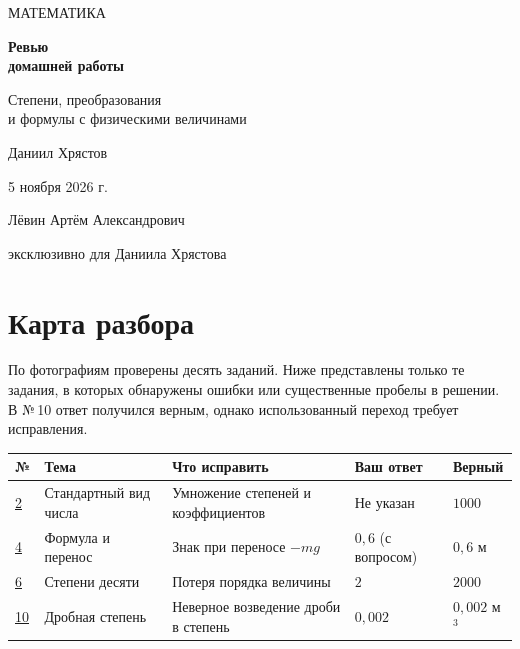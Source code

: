 \documentclass[a4paper,11pt]{article}
\begin{document}
\thispagestyle{empty}
\vspace*{37mm}
{\Large\textcolor{accent}{МАТЕМАТИКА}}\par
\vspace{13mm}
{\fontsize{30}{36}\selectfont\bfseries Ревью\\ домашней работы}\par
\vspace{7mm}
{\Large Степени, преобразования\\ и формулы с физическими величинами}\par
\vspace{24mm}
{\large Даниил Хрястов}\par
\vspace{5mm}
{\normalsize 5 ноября 2026 г.}\par
\vfill
{\normalsize Лёвин Артём Александрович}\par
{\small\textcolor{textgray}{эксклюзивно для Даниила Хрястова}}\par
\vspace{15mm}
\begin{center}
\end{center}
\newpage
\section*{Карта разбора}
По фотографиям проверены десять заданий. Ниже представлены только те задания, в которых обнаружены ошибки или существенные пробелы в решении. В №\,10 ответ получился верным, однако использованный переход требует исправления.\par
\vspace{3mm}
\renewcommand{\arraystretch}{1.3}
\small
\begin{tabularx}{\linewidth}{@{}p{13mm}p{29mm}X p{23mm}p{20mm}@{}}
\toprule
\textbf{№} & \textbf{Тема} & \textbf{Что исправить} & \textbf{Ваш ответ} & \textbf{Верный}\\
\midrule
\hyperref[task:2]{2} & Стандартный вид числа & Умножение степеней и коэффициентов & Не указан & $1000$\\
\hyperref[task:4]{4} & Формула и перенос & Знак при переносе $-mg$ & $0{,}6$ (с вопросом) & $0{,}6$ м\\
\hyperref[task:6]{6} & Степени десяти & Потеря порядка величины & $2$ & $2000$\\
\hyperref[task:10]{10} & Дробная степень & Неверное возведение дроби в степень & $0{,}002$ & $0{,}002$ м$^3$\\
\bottomrule
\end{tabularx}\par
\normalsize
\vspace{5mm}
\end{document}
